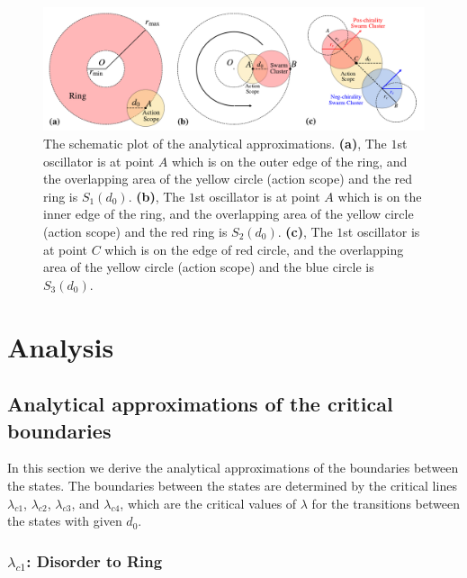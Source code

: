 \documentclass[%
 aip,
 amsmath,amssymb,
 reprint,%
]{revtex4-1}
\begin{document}
\begin{figure}
    \includegraphics[width=\textwidth]{./figs/analyticalEps.pdf}
    \caption{
        \label{fig:analyticalEps}
        The schematic plot of the analytical approximations.
        \textbf{(a)}, The $1$st oscillator is at point $A$ which is on the outer edge of the ring, and the overlapping area of the yellow circle (action scope) and the red ring is $S_1\left( d_0 \right)$.
        \textbf{(b)}, The $1$st oscillator is at point $A$ which is on the inner edge of the ring, and the overlapping area of the yellow circle (action scope) and the red ring is $S_2\left( d_0 \right)$.
        \textbf{(c)}, The $1$st oscillator is at point $C$ which is on the edge of red circle, and the overlapping area of the yellow circle (action scope) and the blue circle is $S_3\left( d_0 \right)$.
    }
\end{figure}

\section{\label{sec:analysis}Analysis}

\subsection{\label{critical} Analytical approximations of the critical boundaries}

In this section we derive the analytical approximations of the boundaries between the states. 
The boundaries between the states are determined by the critical lines $\lambda_{c1}$, $\lambda_{c2}$, $\lambda_{c3}$, and $\lambda_{c4}$, which are the critical values of $\lambda$ for the transitions between the states with given $d_0$.

\subsubsection{$\lambda_{c1}$: Disorder to Ring}
\end{document}
